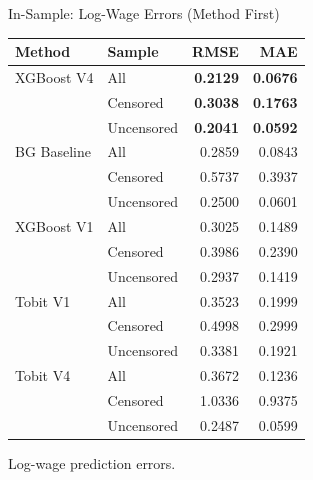 \documentclass[10pt]{beamer}
\newcommand{\best}[1]{\cellcolor{yellow!40}\textbf{#1}}
\begin{document}
\begin{frame}{In-Sample: Log-Wage Errors (Method First)}
\centering
\fontsize{5.5}{6.6}\selectfont
\begin{tabular}{llrr}
\toprule
Method & Sample & RMSE & MAE \\
\midrule
XGBoost V4 & All & \best{0.2129} & \best{0.0676} \\
 & Censored & \best{0.3038} & \best{0.1763} \\
 & Uncensored & \best{0.2041} & \best{0.0592} \\
\midrule
BG Baseline & All & 0.2859 & 0.0843 \\
 & Censored & 0.5737 & 0.3937 \\
 & Uncensored & 0.2500 & 0.0601 \\
\midrule
XGBoost V1 & All & 0.3025 & 0.1489 \\
 & Censored & 0.3986 & 0.2390 \\
 & Uncensored & 0.2937 & 0.1419 \\
\midrule
Tobit V1 & All & 0.3523 & 0.1999 \\
 & Censored & 0.4998 & 0.2999 \\
 & Uncensored & 0.3381 & 0.1921 \\
\midrule
Tobit V4 & All & 0.3672 & 0.1236 \\
 & Censored & 1.0336 & 0.9375 \\
 & Uncensored & 0.2487 & 0.0599 \\
\bottomrule
\end{tabular}

\vspace{0.25cm}
\small
Log-wage prediction errors.
\end{frame}
\end{document}
